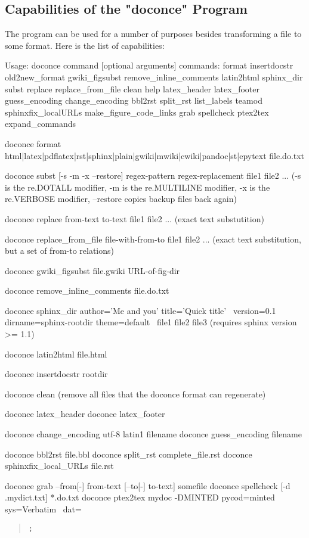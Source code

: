 \documentclass[twoside]{book}
\begin{document}
{\subsection{Capabilities of the "doconce" Program}

The  program can be used for a number of purposes besides
transforming a  file to some format. Here is the
list of capabilities:

\bshpro
Usage: doconce command [optional arguments]
commands: format insertdocstr old2new_format gwiki_figsubst remove_inline_comments latin2html sphinx_dir subst replace replace_from_file clean help latex_header latex_footer guess_encoding change_encoding bbl2rst split_rst list_labels teamod sphinxfix_localURLs make_figure_code_links grab spellcheck ptex2tex expand_commands

doconce format html|latex|pdflatex|rst|sphinx|plain|gwiki|mwiki|cwiki|pandoc|st|epytext file.do.txt

doconce subst [-s -m -x --restore] regex-pattern regex-replacement file1 file2 ...
(-s is the re.DOTALL modifier, -m is the re.MULTILINE modifier,
 -x is the re.VERBOSE modifier, --restore copies backup files back again)

doconce replace from-text to-text file1 file2 ...
(exact text substutition)

doconce replace_from_file file-with-from-to file1 file2 ...
(exact text substitution, but a set of from-to relations)

doconce gwiki_figsubst file.gwiki URL-of-fig-dir

doconce remove_inline_comments file.do.txt

doconce sphinx_dir author='Me and you' title='Quick title' \
    version=0.1 dirname=sphinx-rootdir theme=default \
    file1 file2 file3
(requires sphinx version >= 1.1)

doconce latin2html file.html

doconce insertdocstr rootdir

doconce clean
(remove all files that the doconce format can regenerate)

doconce latex_header
doconce latex_footer

doconce change_encoding utf-8 latin1 filename
doconce guess_encoding filename

doconce bbl2rst file.bbl
doconce split_rst complete_file.rst
doconce sphinxfix_local_URLs file.rst

doconce grab --from[-] from-text [--to[-] to-text] somefile
doconce spellcheck [-d .mydict.txt] *.do.txt
doconce ptex2tex mydoc -DMINTED pycod=minted sys=Verbatim \
        dat=\begin{quote}\begin{verbatim};\end{verbatim}\end{quote}

}
\end{document}
